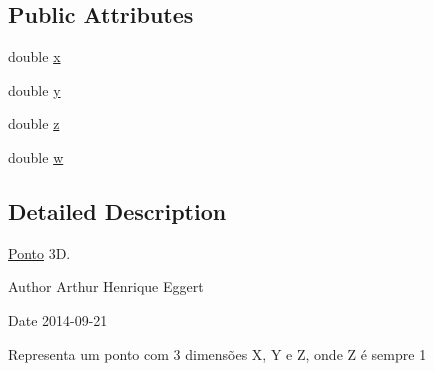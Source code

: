 \subsection*{Public Attributes}
\begin{DoxyCompactItemize}
\item 
double \hyperlink{classPonto_a19d9967c487a947f94938ce37346ed3c}{x}
\item 
double \hyperlink{classPonto_afc19597e54764ae43c0211a34adc98c8}{y}
\item 
double \hyperlink{classPonto_ab5f76e914355c1bb1c5542a0a6093f5c}{z}
\item 
double \hyperlink{classPonto_afb59351a6bdb8509302ffeda9ac77091}{w}
\end{DoxyCompactItemize}


\subsection{Detailed Description}
\hyperlink{classPonto}{Ponto} 3\+D. 

\begin{DoxyAuthor}{Author}
Arthur Henrique Eggert 
\end{DoxyAuthor}
\begin{DoxyDate}{Date}
2014-\/09-\/21
\end{DoxyDate}
Representa um ponto com 3 dimensões X, Y e Z, onde Z é sempre 1 

